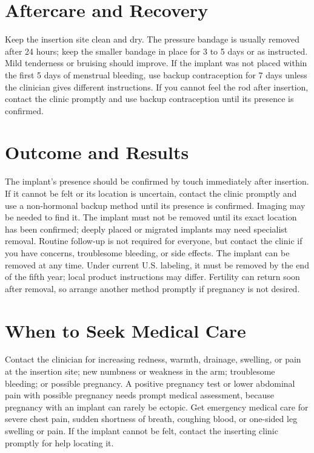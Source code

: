\section*{Aftercare and Recovery}
Keep the insertion site clean and dry. The pressure bandage is usually removed after 24 hours; keep the smaller bandage in place for 3 to 5 days or as instructed. Mild tenderness or bruising should improve. If the implant was not placed within the first 5 days of menstrual bleeding, use backup contraception for 7 days unless the clinician gives different instructions. If you cannot feel the rod after insertion, contact the clinic promptly and use backup contraception until its presence is confirmed.

\section*{Outcome and Results}
The implant's presence should be confirmed by touch immediately after insertion. If it cannot be felt or its location is uncertain, contact the clinic promptly and use a non-hormonal backup method until its presence is confirmed. Imaging may be needed to find it. The implant must not be removed until its exact location has been confirmed; deeply placed or migrated implants may need specialist removal. Routine follow-up is not required for everyone, but contact the clinic if you have concerns, troublesome bleeding, or side effects. The implant can be removed at any time. Under current U.S. labeling, it must be removed by the end of the fifth year; local product instructions may differ. Fertility can return soon after removal, so arrange another method promptly if pregnancy is not desired.

\section*{When to Seek Medical Care}
Contact the clinician for increasing redness, warmth, drainage, swelling, or pain at the insertion site; new numbness or weakness in the arm; troublesome bleeding; or possible pregnancy. A positive pregnancy test or lower abdominal pain with possible pregnancy needs prompt medical assessment, because pregnancy with an implant can rarely be ectopic. Get emergency medical care for severe chest pain, sudden shortness of breath, coughing blood, or one-sided leg swelling or pain. If the implant cannot be felt, contact the inserting clinic promptly for help locating it.

